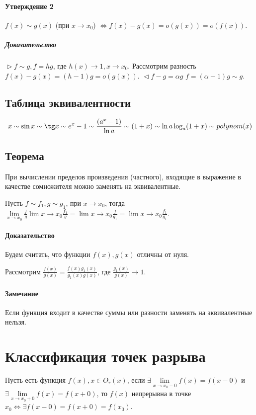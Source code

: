 \documentclass[10pt]{article}
\newcommand{\limx}[1]{\lim\limits_{x \to #1}}
\begin{document}
		\paragraph{Утверждение 2}
		$f(x) \sim g(x)$ (при $x \to x_0$) $\Leftrightarrow f(x) - g(x) = o(g(x)) = o(f(x))$.
			\subparagraph{Доказательство}
			$\vartriangleright f \sim g, f = hg$, где $h(x) \to 1, x \to x_0$. Рассмотрим разность $f(x) - g(x) = (h - 1)g = o(g(x))$.
			$\vartriangleleft f - g = \alpha g$ $f = (\alpha+ 1)g \sim g$.
		\subsection{Таблица эквивалентности}
		\begin{eqnarray}
			x \sim \sin x \sim \tg x \sim e^{x}-1 \sim \frac{(a^x - 1)}{\ln a} \sim (1+x) \sim \ln a \log_a(1+x) \sim polynom(x)
		\end{eqnarray}
		
		\subsection{Теорема}
		При вычислении пределов произведения (частного), входящие в выражение в качестве сомножителя можно заменять на эквивалентные.
		
		Пусть $f \sim f_1, g \sim g_1$, при $x \to x_0$, тогда $\lim\limits_{x \to x_0} \frac{f}{g} \lim\limits{x \to x_0} \frac{f_1}{g} = \lim\limits{x \to x_0} \frac{f}{g_1} = \lim\limits{x \to x_0} \frac{f_1}{g_1}$.
		
		\paragraph{Доказательство} Будем считать, что функции $f(x), g(x)$ отличны от нуля.
		
		Рассмотрим $\frac{f(x)}{g(x)} = \frac{f(x)g_1(x)}{g_1(x)g(x)}$, где $\frac{g_1(x)}{g(x)} \to 1$.
		
		\paragraph{Замечание} Если функция входит в качестве суммы или разности заменять на эквивалентные нельзя.
		
		\section{Классификация точек разрыва}
		Пусть есть функция $f(x), x\in O_r(x)$, если $\exists \limx{x_0 - 0} f(x) = f(x - 0)$ и $\exists \limx{x_0 + 0} f(x) = f(x+0)$, то $f(x)$ непрерывна в точке $x_0 \Leftrightarrow \exists f(x-0) = f(x + 0) = f(x_0)$.
		
\end{document}
